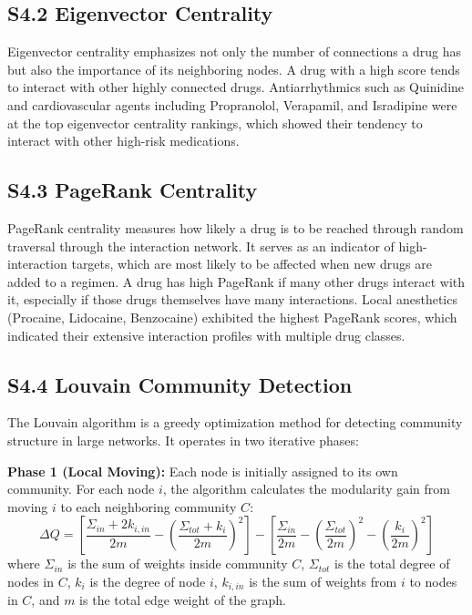 \documentclass[12pt,a4paper]{article}
\begin{document}
\subsection{S4.2 Eigenvector Centrality}

Eigenvector centrality emphasizes not only the number of connections a drug has but also the importance of its neighboring nodes. A drug with a high score tends to interact with other highly connected drugs. Antiarrhythmics such as Quinidine and cardiovascular agents including Propranolol, Verapamil, and Isradipine were at the top eigenvector centrality rankings, which showed their tendency to interact with other high-risk medications.

\subsection{S4.3 PageRank Centrality}

PageRank centrality measures how likely a drug is to be reached through random traversal through the interaction network. It serves as an indicator of high-interaction targets, which are most likely to be affected when new drugs are added to a regimen. A drug has high PageRank if many other drugs interact with it, especially if those drugs themselves have many interactions. Local anesthetics (Procaine, Lidocaine, Benzocaine) exhibited the highest PageRank scores, which indicated their extensive interaction profiles with multiple drug classes.

\subsection{S4.4 Louvain Community Detection}

The Louvain algorithm is a greedy optimization method for detecting community structure in large networks. It operates in two iterative phases:

\textbf{Phase 1 (Local Moving):} Each node is initially assigned to its own community. For each node $i$, the algorithm calculates the modularity gain from moving $i$ to each neighboring community $C$:
\[
\Delta Q = \left[ \frac{\Sigma_{in} + 2k_{i,in}}{2m} - \left( \frac{\Sigma_{tot} + k_i}{2m} \right)^2 \right] - \left[ \frac{\Sigma_{in}}{2m} - \left( \frac{\Sigma_{tot}}{2m} \right)^2 - \left( \frac{k_i}{2m} \right)^2 \right]
\]
where $\Sigma_{in}$ is the sum of weights inside community $C$, $\Sigma_{tot}$ is the total degree of nodes in $C$, $k_i$ is the degree of node $i$, $k_{i,in}$ is the sum of weights from $i$ to nodes in $C$, and $m$ is the total edge weight of the graph.
\end{document}
